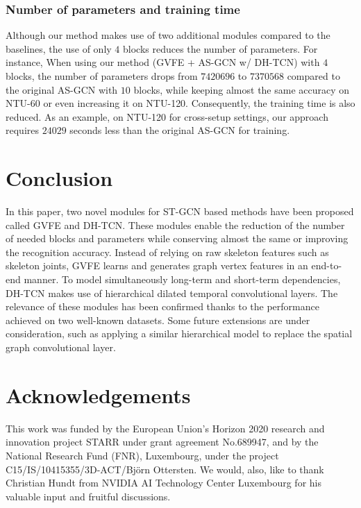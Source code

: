 \documentclass{article}
\begin{document}
\subsubsection{Number of parameters and training time}

Although our method makes use of two additional modules compared to the baselines, the use of only $4$ blocks reduces the number of parameters. For instance, When using our method (GVFE + AS-GCN w/ DH-TCN) with $4$ blocks, the number of parameters drops from $7420696$ to $7370568$ compared to the original AS-GCN with $10$ blocks, while keeping almost the same accuracy on NTU-60 or even increasing it on NTU-120. Consequently, the training time is also reduced. As an example, on NTU-120 for cross-setup settings, our approach requires $24029$ seconds less than the original AS-GCN for training. 

\section{Conclusion}
\label{sec:conclusion}

In this paper, two novel modules for ST-GCN based methods have been proposed called GVFE and DH-TCN. These modules enable the reduction of the number of needed blocks and parameters while conserving almost the same or improving the recognition accuracy. Instead of relying on raw skeleton features such as skeleton joints, GVFE learns and generates graph vertex features in an end-to-end manner. To model simultaneously long-term and short-term dependencies, DH-TCN makes use of hierarchical dilated temporal convolutional layers. The relevance of these modules has been confirmed thanks to the performance achieved on two well-known datasets. Some future extensions are under consideration, such as applying a similar hierarchical model to replace the spatial graph convolutional layer. 

\section{Acknowledgements}
\label{sec:acknowledgements}
This work was funded by the European Union's Horizon 2020 research and innovation project STARR under grant agreement No.689947, and by the National Research Fund (FNR), Luxembourg, under the project C15/IS/10415355/3D-ACT/Bj\"{o}rn Ottersten. We would, also, like to thank Christian Hundt from NVIDIA AI Technology Center Luxembourg for his valuable input and fruitful discussions.



\end{document}
